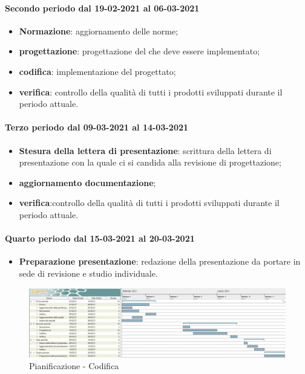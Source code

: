 \paragraph{Secondo periodo dal 19-02-2021 al 06-03-2021}
\begin{itemize}
	\item \textbf{Normazione}: aggiornamento delle norme;
	\item \textbf{progettazione}: progettazione del  che deve essere implementato;
	\item \textbf{codifica}: implementazione del  progettato;
	\item \textbf{verifica}: controllo della qualità di tutti i prodotti sviluppati durante il periodo attuale.
\end{itemize}

\paragraph{Terzo periodo dal 09-03-2021 al 14-03-2021}
\begin{itemize}
		\item \textbf{Stesura della lettera di presentazione}: scrittura della lettera di presentazione con la quale ci
	si candida alla revisione di progettazione;
		\item \textbf{aggiornamento documentazione};
	\item \textbf{verifica}:controllo della qualità di tutti i prodotti sviluppati durante il periodo attuale.
\end{itemize}

\paragraph{Quarto periodo dal 15-03-2021 al 20-03-2021}
\begin{itemize}
	\item \textbf{Preparazione presentazione}: redazione della presentazione da portare in sede di revisione e
	studio individuale.
\end{itemize}

\newpage
\begin{landscape}
	\begin{figure}[h!]
		\includegraphics[width=24cm]{images/tb.jpg}
		\caption{Pianificazione - Codifica }
	\end{figure}
\end{landscape}

